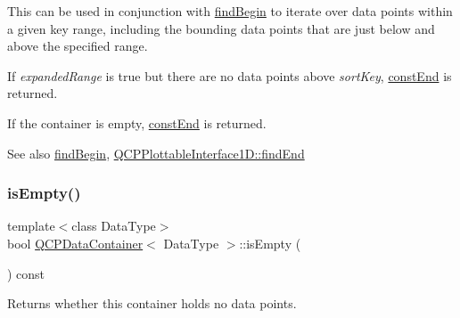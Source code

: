 This can be used in conjunction with \mbox{\hyperlink{class_q_c_p_data_container_a2ad8a5399072d99a242d3a6d2d7e278a}{find\+Begin}} to iterate over data points within a given key range, including the bounding data points that are just below and above the specified range.

If {\itshape expanded\+Range} is true but there are no data points above {\itshape sort\+Key}, \mbox{\hyperlink{class_q_c_p_data_container_aa7f7cf239b85b1a28de3d675cc5b3da1}{const\+End}} is returned.

If the container is empty, \mbox{\hyperlink{class_q_c_p_data_container_aa7f7cf239b85b1a28de3d675cc5b3da1}{const\+End}} is returned.

\begin{DoxySeeAlso}{See also}
\mbox{\hyperlink{class_q_c_p_data_container_a2ad8a5399072d99a242d3a6d2d7e278a}{find\+Begin}}, \mbox{\hyperlink{class_q_c_p_plottable_interface1_d_a5deced1016bc55a41a2339619045b295}{Q\+C\+P\+Plottable\+Interface1\+D\+::find\+End}} 
\end{DoxySeeAlso}
\mbox{\label{class_q_c_p_data_container_a7bdebfccd2f9f84bf032882f9d6b00a8}} 
\subsubsection{\texorpdfstring{isEmpty()}{isEmpty()}}
{\footnotesize\ttfamily template$<$class Data\+Type$>$ \\
bool \mbox{\hyperlink{class_q_c_p_data_container}{Q\+C\+P\+Data\+Container}}$<$ Data\+Type $>$\+::is\+Empty (\begin{DoxyParamCaption}{ }\end{DoxyParamCaption}) const\hspace{0.3cm}{\ttfamily [inline]}}

Returns whether this container holds no data points. \mbox{\label{class_q_c_p_data_container_aba6e1a93c21ccc56a432b4a02c9d0ed2}} 
